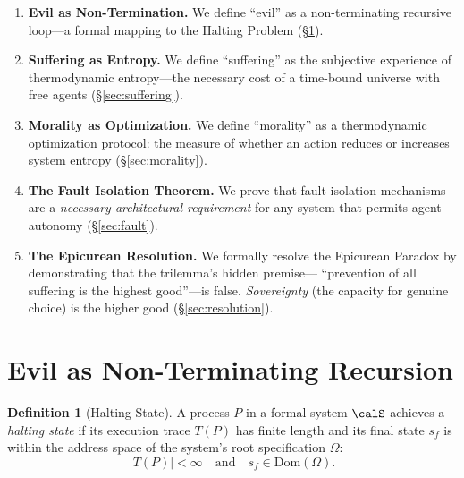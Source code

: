 \documentclass[12pt, a4paper]{article}
\theoremstyle{plain}
\theoremstyle{definition}
\newtheorem{definition}[theorem]{Definition}
\begin{document}
\begin{enumerate}
  \item \textbf{Evil as Non-Termination.} We define ``evil'' as a
    non-terminating recursive loop---a formal mapping to the Halting
    Problem (\S\ref{sec:evil}).

  \item \textbf{Suffering as Entropy.} We define ``suffering'' as the
    subjective experience of thermodynamic entropy---the necessary cost
    of a time-bound universe with free agents (\S\ref{sec:suffering}).

  \item \textbf{Morality as Optimization.} We define ``morality'' as a
    thermodynamic optimization protocol: the measure of whether an action
    reduces or increases system entropy (\S\ref{sec:morality}).

  \item \textbf{The Fault Isolation Theorem.} We prove that fault-isolation
    mechanisms are a \emph{necessary architectural requirement} for any
    system that permits agent autonomy (\S\ref{sec:fault}).

  \item \textbf{The Epicurean Resolution.} We formally resolve the
    Epicurean Paradox by demonstrating that the trilemma's hidden premise---
    ``prevention of all suffering is the highest good''---is false.
    \emph{Sovereignty} (the capacity for genuine choice) is the higher
    good (\S\ref{sec:resolution}).
\end{enumerate}

\section{Evil as Non-Terminating Recursion}\label{sec:evil}

\begin{definition}[Halting State]\label{def:halting}
  A process $P$ in a formal system $\calS$ achieves a \emph{halting state}
  if its execution trace $T(P)$ has finite length and its final state $s_f$
  is within the address space of the system's root specification $\Omega$:
  \begin{equation}
    |T(P)| < \infty \quad \text{and} \quad s_f \in \text{Dom}(\Omega).
  \end{equation}
\end{definition}
\end{document}
